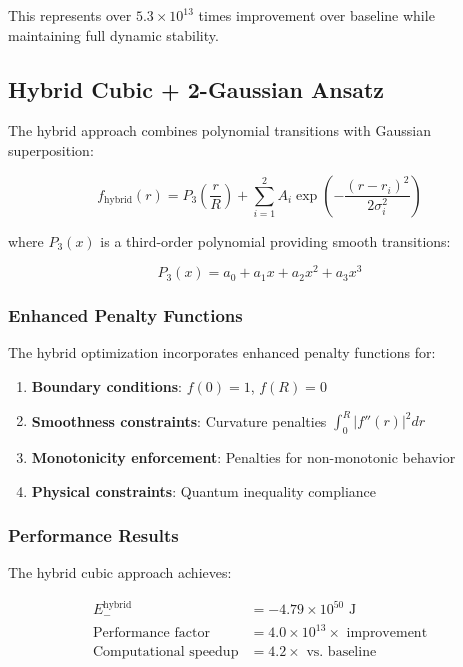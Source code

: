 \documentclass[12pt,a4paper]{article}
\begin{document}
This represents over $5.3 \times 10^{13}$ times improvement over baseline while maintaining full dynamic stability.

\subsection{Hybrid Cubic + 2-Gaussian Ansatz}

The hybrid approach combines polynomial transitions with Gaussian superposition:

\begin{equation}
f_{\text{hybrid}}(r) = P_3\left(\frac{r}{R}\right) + \sum_{i=1}^{2} A_i \exp\left(-\frac{(r - r_i)^2}{2\sigma_i^2}\right)
\end{equation}

where $P_3(x)$ is a third-order polynomial providing smooth transitions:

\begin{equation}
P_3(x) = a_0 + a_1 x + a_2 x^2 + a_3 x^3
\end{equation}

\subsubsection{Enhanced Penalty Functions}

The hybrid optimization incorporates enhanced penalty functions for:

\begin{enumerate}
\item \textbf{Boundary conditions}: $f(0) = 1$, $f(R) = 0$
\item \textbf{Smoothness constraints}: Curvature penalties $\int_0^R |f''(r)|^2 dr$
\item \textbf{Monotonicity enforcement}: Penalties for non-monotonic behavior
\item \textbf{Physical constraints}: Quantum inequality compliance
\end{enumerate}

\subsubsection{Performance Results}

The hybrid cubic approach achieves:

\begin{align}
E_{-}^{\text{hybrid}} &= -4.79 \times 10^{50} \text{ J} \\
\text{Performance factor} &= 4.0 \times 10^{13} \times \text{ improvement} \\
\text{Computational speedup} &= 4.2 \times \text{ vs. baseline}
\end{align}
\end{document}
